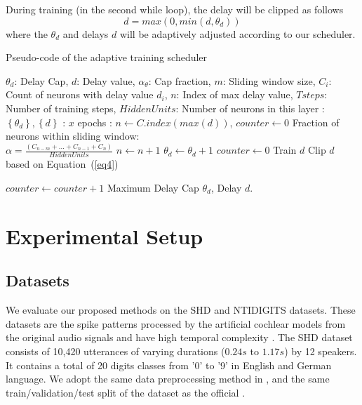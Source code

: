 \documentclass{article}
\begin{document}
During training (in the second while loop), the delay will be clipped as follows 
\begin{equation}
          {d} = max(0, min(d, \theta_d))
\label{eq4}
\end{equation}
where the $\theta_d$ and delays $d$ will be adaptively adjusted according to our scheduler.
\begin{algorithm}[ht]
\renewcommand{\algorithmicrequire}{\textbf{Input:}}
	\renewcommand{\algorithmicensure}{\textbf{Output:}}
	\caption{Pseudo-code of the adaptive training scheduler}
	\label{alg1}
	\begin{algorithmic}[0]
	\REQUIRE $\theta_d$: Delay Cap, $d$: Delay value, $\alpha_{\theta}$: Cap fraction, $m$: Sliding window size, $C_{i}$: Count of neurons with delay value $d_{i}$, $n$: Index of max delay value, $Tsteps$: Number of training steps, $Hidden Units$: Number of neurons in this layer
		:$\left\{ {\theta_{d}} \right\},\left\{ d \right\} $
	    : $x$ epochs
	    : $n \leftarrow C.index(max(d))$, $counter \leftarrow 0$	
	    \STATE Fraction of neurons within sliding window:\\ 
	    $\alpha =\frac{(C_{n-m}+...+C_{n-1}+C_{n})}{Hidden Units}$ 
		\WHILE{{$ \alpha  > \alpha_{\theta}$ }}
		\STATE $n \leftarrow n + 1$
		\STATE $\theta_{d} \leftarrow \theta_{d} + 1$
		\STATE $counter \leftarrow 0$
		\STATE Train $d$
     	\STATE Clip $d$ based on Equation~(\ref{eq4})

	\STATE $counter \leftarrow counter + 1$ 	
		\ENDWHILE
		\ENDWHILE
		\ENSURE Maximum Delay Cap $\theta_d$, Delay $d$.
	\end{algorithmic}  
\end{algorithm}


\section{Experimental Setup}\label{3}
\subsection{Datasets}
We evaluate our proposed methods on the SHD \cite{cramer2020heidelberg} and NTIDIGITS \cite{anumula2018feature} datasets. These datasets are the spike patterns processed by the artificial cochlear models\cite{cramer2020heidelberg, anumula2018feature} from the original audio signals and have high temporal complexity \cite{iyer2021neuromorphic}. The SHD dataset consists of 10,420 utterances of varying durations ($0.24s$ to $1.17s$) by  12 speakers. It contains a total of 20 digits classes from '0' to '9' in English and German language. We adopt the same data preprocessing method in \cite{yin2020effective}, and the same train/validation/test split of the dataset as the official \cite{cramer2020heidelberg}.
\end{document}
